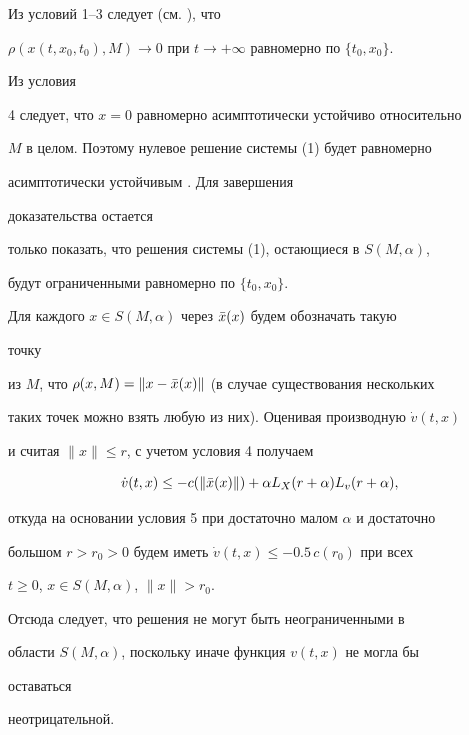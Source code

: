 \begin{pf} Из условий 1--3 следует (см. \cite{M1}), что 


$\rho(x(t,x_0,t_0),M)\to 0$ при $t\to+\infty$ равномерно по $\{t_0,x_0\}$. 


Из условия 


4 следует, что $x=0$ равномерно асимптотически устойчиво относительно 


$M$ в целом. Поэтому нулевое решение системы (1) будет равномерно 


асимптотически устойчивым \cite{Kos2}. Для завершения 


доказательства остается 


только показать, что решения системы (1), остающиеся в $S(M,\alpha)$, 


будут ограниченными равномерно по $\{t_0,x_0\}$. 


 


Для каждого $x\in S(M,\alpha)$ через $\Bar x(x)$ будем обозначать такую 


точку 


из $M$, что $\rho(x,M)=\|x-\Bar x(x)\|$ (в случае существования нескольких 


таких точек можно взять любую из них). Оценивая производную $\Dot v(t,x)$ 


и считая $\|x\|\le r$, с учетом условия 4 получаем 


$$ 


\Dot v(t,x)\le -c(\|\Bar x(x)\|)+\alpha L_X(r+\alpha) 


L_v(r+\alpha), 


$$ 


откуда на основании условия 5 при достаточно малом $\alpha$ и достаточно 


большом $r>r_0>0$ будем иметь $\Dot v(t,x)\le -0.5\,c(r_0)$ при всех 


$t\ge 0$, $x\in S(M,\alpha)$, $\|x\|>r_0$. 


 


Отсюда следует, что решения не могут быть неограниченными в 


области $S(M,\alpha)$, поскольку иначе функция $v(t,x)$ не могла бы 


оставаться 


неотрицательной. 


\end{pf} 


 


